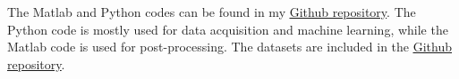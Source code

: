 The Matlab and Python codes can be found in my \underline{\href{https://github.com/KarimBouzid/IFC_impedance_sensor}{Github repository}}. The Python code is mostly used for data acquisition and machine learning, while the Matlab code is used for post-processing. The datasets are included in the \underline{\href{https://github.com/KarimBouzid/IFC_impedance_sensor}{Github repository}}. 